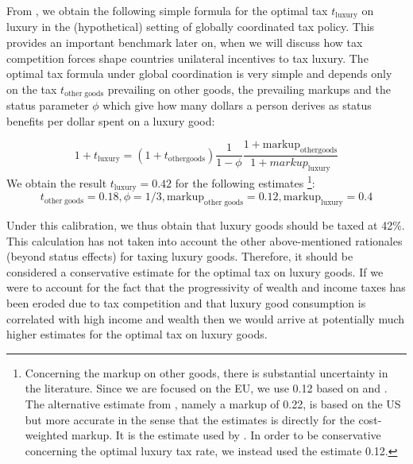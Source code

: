 \documentclass{article}
\begin{document}
From \citet{Xie2026}, we obtain the following simple formula for the optimal tax $t_{\mathrm{luxury}}$ on luxury in the (hypothetical) setting of globally coordinated tax policy. This provides an important benchmark later on, when we will discuss how tax competition forces shape countries unilateral incentives to tax luxury. The optimal tax formula under global coordination is very simple and depends only on the tax $t_{\mathrm{other\;goods}}$ prevailing on other goods, the prevailing markups and the status parameter $\phi$ which give how many dollars a person derives as status benefits per dollar spent on a luxury good: 

\[    1+t_{\mathrm{luxury}}=(1+t_{\mathrm{other goods}})\frac{1}{1-\phi}\frac{1+\mathrm{markup}_{\mathrm{other goods}}}{1+markup_{\mathrm{luxury}}}\]
We obtain the result  $t_{\mathrm{luxury}}=0.42$ for the following  estimates \footnote{Concerning the markup on other goods, there is substantial uncertainty in the literature. Since we are focused on the EU, we use 0.12 based on \citet{weche2021fall} and \citet{ganglmair2021markups}. The alternative estimate from \citet{edmond2023cost}, namely a markup of 0.22, is based on the US but more accurate in the sense that the estimates is directly for the cost-weighted markup. It is the estimate used by \citet{Xie2026}. In order to be conservative concerning the optimal luxury tax rate, we instead used the estimate 0.12.}:
\[
t_{\mathrm{other\;goods}}=0.18 ,\phi=1/3
, \mathrm{markup}_{\mathrm{other\;goods}}=0.12,\mathrm{markup}_{\mathrm{luxury}}=0.4\]

Under this calibration, we thus obtain that luxury goods should be taxed at 42\%. This calculation has not taken into account the other above-mentioned rationales (beyond status effects) for taxing luxury goods. Therefore, it should be considered a conservative estimate for the optimal tax on luxury goods. If we were to account for the fact that the progressivity of wealth and income taxes has been eroded due to tax competition and that luxury good consumption is correlated with high income and wealth then we would arrive at potentially much higher estimates for the optimal tax on luxury goods. %

\end{document}
